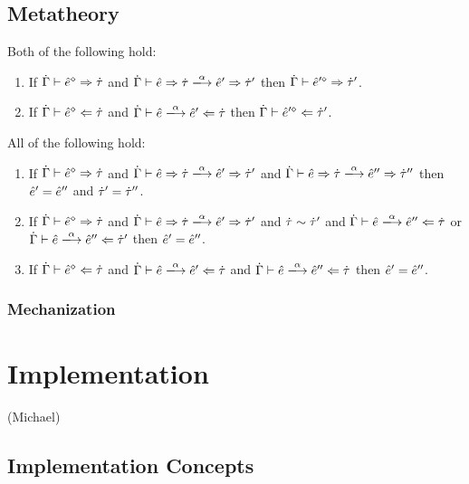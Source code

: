 \documentclass{llncs}
\begin{document}
\subsection{Metatheory}
\begin{theorem} Both of the following hold:
\begin{enumerate}
\item If $\dot{\Gamma} \vdash \hat{e}^{\diamond} \Rightarrow \dot{\tau}$  and $\performSyn{\hGamma}{\zexp}{\htau}{\alpha}{\zexp'}{\htau'}$ then $\dot{\Gamma} \vdash \hat{e}'^{\diamond} \Rightarrow \dot{\tau}'$. 
\item If  $\dot{\Gamma} \vdash \hat{e}^{\diamond} \Leftarrow \dot{\tau}$ and $\performAna{\hGamma}{\zexp}{\htau}{\alpha}{\zexp'}$ then $\dot{\Gamma} \vdash \hat{e}'^{\diamond} \Leftarrow \dot{\tau}'$. 
\end{enumerate}
\end{theorem}

\begin{theorem} All of the following hold:
\begin{enumerate}
\item If $\dot{\Gamma} \vdash \hat{e}^{\diamond} \Rightarrow \dot{\tau}$ and $\performSyn{\hGamma}{\zexp}{\htau}{\alpha}{\zexp'}{\htau'}$ and $\performSyn{\hGamma}{\zexp}{\htau}{\alpha}{\zexp''}{\htau''}$ then $\hat{e}' = \hat{e}''$ and $\dot{\tau}' = \dot{\tau}''$. 
\item If $\dot{\Gamma} \vdash \hat{e}^{\diamond} \Rightarrow \dot{\tau}$ and $\performSyn{\hGamma}{\zexp}{\htau}{\alpha}{\zexp'}{\htau'}$ and $\dot{\tau} \sim \dot{\tau}'$ and $\performAna{\hGamma}{\zexp}{\htau}{\alpha}{\zexp''}$ or $\performAna{\hGamma}{\zexp}{\htau'}{\alpha}{\zexp''}$ then $\hat{e}' = \hat{e}''$.
\item If $\dot{\Gamma} \vdash \hat{e}^{\diamond} \Leftarrow \dot{\tau}$ and $\performAna{\hGamma}{\zexp}{\htau}{\alpha}{\zexp'}$ and $\performAna{\hGamma}{\zexp}{\htau}{\alpha}{\zexp''}$ then $\hat{e}' = \hat{e}''$.
\end{enumerate}
\end{theorem}


\subsubsection{Mechanization}


\section{Implementation}
(Michael)

\subsection{Implementation Concepts}
\end{document}
